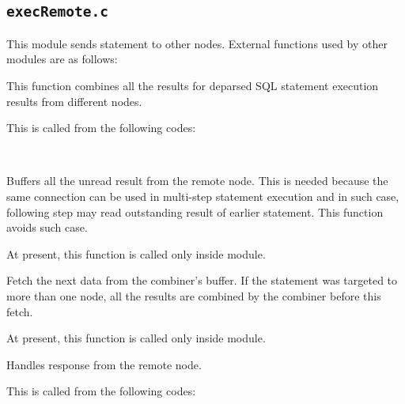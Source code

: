 
\subsection{\texttt{execRemote.c}}

  This module sends statement to other nodes.
  External functions used by other modules are as follows:
  
  
      This function combines all the results for deparsed SQL statement
      execution results from different nodes.
      
      This is called from the following codes:
      
      \FuncRefHdr
      \\ \hline
      \FuncRefTrailor
  
  
      Buffers all the unread result from the remote node.
      This is needed because the same connection can be used in multi-step
      statement execution and in such case, following step may read
      outstanding result of earlier statement.
      This function avoids such case.
      
      At present, this function is called only inside  module.
  
  
      Fetch the next data from the combiner's buffer.
      If the statement was targeted to more than one node, all the results
      are combined by the combiner before this fetch.
      
      At present, this function is called only inside  module.
  
  
      Handles response from the remote node.
      
      This is called from the following codes:
      
      \FuncRefHdr
		  \\ \hline
      \FuncRefTrailor
      
